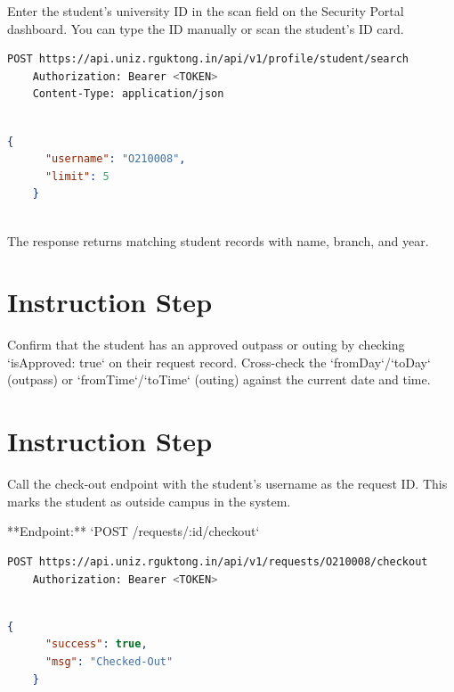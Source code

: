     Enter the student's university ID in the scan field on the Security Portal dashboard. You can type the ID manually or scan the student's ID card.

    \begin{lstlisting}[language=bash]
    POST https://api.uniz.rguktong.in/api/v1/profile/student/search
    Authorization: Bearer <TOKEN>
    Content-Type: application/json
    
\end{lstlisting}

    \begin{lstlisting}[language=json]
    {
      "username": "O210008",
      "limit": 5
    }
    
\end{lstlisting}

    The response returns matching student records with name, branch, and year.

  
  
\section{Instruction Step}

    Confirm that the student has an approved outpass or outing by checking `isApproved: true` on their request record. Cross-check the `fromDay`/`toDay` (outpass) or `fromTime`/`toTime` (outing) against the current date and time.
  
  
\section{Instruction Step}

    Call the check-out endpoint with the student's username as the request ID. This marks the student as outside campus in the system.

    **Endpoint:** `POST /requests/:id/checkout`

    \begin{lstlisting}[language=bash]
    POST https://api.uniz.rguktong.in/api/v1/requests/O210008/checkout
    Authorization: Bearer <TOKEN>
    
\end{lstlisting}

    \begin{lstlisting}[language=json]
    {
      "success": true,
      "msg": "Checked-Out"
    }
    
\end{lstlisting}

